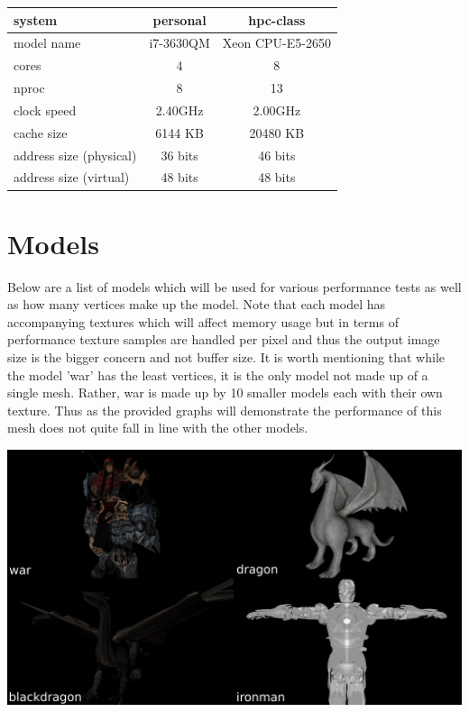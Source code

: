 \documentclass[12pt]{article}
\begin{document}
\bigbreak
\begin{center}
	\begin{tabular}{|l|c|c|}
		\hline
		system & personal & hpc-class \\ \hline \hline
		model name & i7-3630QM & Xeon CPU-E5-2650 \\ \hline
		cores & 4 & 8 \\ \hline
		nproc & 8 & 13 \\ \hline
		clock speed & 2.40GHz & 2.00GHz \\ \hline
		cache size & 6144 KB & 20480 KB \\ \hline
		address size (physical) & 36 bits & 46 bits \\ \hline
		address size (virtual) & 48 bits & 48 bits \\ \hline
	\end{tabular}
\end{center}

\section*{Models}

Below are a list of models which will be used for various performance tests as well as how many
vertices make up the model. Note that each model has accompanying textures which will affect memory
usage but in terms of performance texture samples are handled per pixel and thus the output image
size is the bigger concern and not buffer size.
It is worth mentioning that while the model 'war' has the least vertices, it is the only model
not made up of a single mesh. Rather, war is made up by 10 smaller models each with their own texture.
Thus as the provided graphs will demonstrate the performance of this mesh does not quite fall in line
with the other models.

\begin{center}
	\includegraphics[scale=0.225]{models.png}
\end{center}
\end{document}
